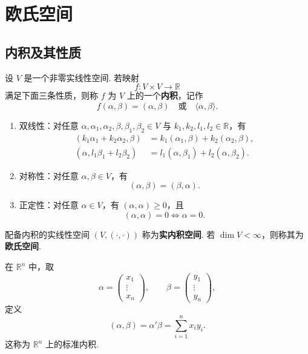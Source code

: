 \setchapterintro{}
\chapter{欧氏空间}
\section{内积及其性质}
\begin{definition}\label{p1:concept:c6-l6}
	设 $V$ 是一个非零实线性空间. 若映射
	\[
	f:V\times V\longrightarrow \mathbb{R}
	\]
	满足下面三条性质，则称 $f$ 为 $V$ 上的一个\textbf{内积}，记作
	\[
	f(\alpha,\beta)=(\alpha,\beta)\quad \text{或}\quad \langle \alpha,\beta\rangle .
	\]
	\begin{enumerate}
		\item 双线性：对任意 $\alpha,\alpha_1,\alpha_2,\beta,\beta_1,\beta_2\in V$ 与 $k_1,k_2,l_1,l_2\in\mathbb{R}$，有
		\[
		\begin{aligned}
			(k_1\alpha_1+k_2\alpha_2,\beta)&=k_1(\alpha_1,\beta)+k_2(\alpha_2,\beta),\\
			(\alpha,l_1\beta_1+l_2\beta_2)&=l_1(\alpha,\beta_1)+l_2(\alpha,\beta_2).
		\end{aligned}
		\]
		\item 对称性：对任意 $\alpha,\beta\in V$，有
		\[
		(\alpha,\beta)=(\beta,\alpha).
		\]
		\item 正定性：对任意 $\alpha\in V$，有 $(\alpha,\alpha)\geqslant 0$，且
		\[
		(\alpha,\alpha)=0\Longleftrightarrow \alpha=0.
		\]
	\end{enumerate}
	配备内积的实线性空间 $(V,(\cdot,\cdot))$ 称为\textbf{实内积空间}. 若 $\dim V<\infty$，则称其为\textbf{欧氏空间}.
\end{definition}

\begin{example}
	在 $\mathbb{R}^n$ 中，取
	\[
	\alpha=\begin{pmatrix}x_1\\ \vdots\\ x_n\end{pmatrix},
	\qquad
	\beta=\begin{pmatrix}y_1\\ \vdots\\ y_n\end{pmatrix},
	\]
	定义
	\[
	(\alpha,\beta)=\alpha'\beta=\sum_{i=1}^{n}x_i y_i.
	\]
	\label{p1:concept:c6-l46}这称为 $\mathbb{R}^n$ 上的标准内积.
\end{example}

